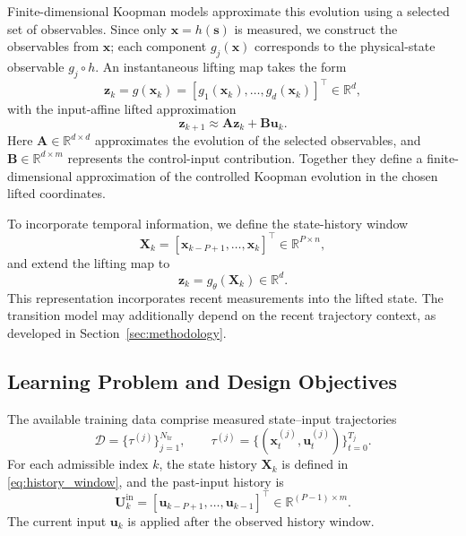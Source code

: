 \documentclass[journal]{IEEEtran}
\newcommand{\vx}{\mathbf{x}}
\newcommand{\vu}{\mathbf{u}}
\newcommand{\vz}{\mathbf{z}}
\newcommand{\vs}{\mathbf{s}}
\newcommand{\mA}{\mathbf{A}}
\newcommand{\mB}{\mathbf{B}}
\newcommand{\mX}{\mathbf{X}}
\newcommand{\mU}{\mathbf{U}}
\begin{document}
Finite-dimensional Koopman models approximate this evolution using a selected set of observables. Since only $\vx=h(\vs)$ is measured, we construct the observables from $\vx$; each component $g_j(\vx)$ corresponds to the physical-state observable $g_j\circ h$. An instantaneous lifting map takes the form
\begin{equation}
    \vz_k = g(\vx_k) = [g_1(\vx_k), \ldots, g_d(\vx_k)]^\top \in \mathbb{R}^d,
    \label{eq:instantaneous_lifting}
\end{equation}
with the input-affine lifted approximation
\begin{equation}
    \vz_{k+1} \approx \mA \vz_k + \mB \vu_k.
    \label{eq:linear_lifted}
\end{equation}
Here $\mA \in \mathbb{R}^{d\times d}$ approximates the evolution of the selected observables, and $\mB \in \mathbb{R}^{d\times m}$ represents the control-input contribution. Together they define a finite-dimensional approximation of the controlled Koopman evolution in the chosen lifted coordinates.

To incorporate temporal information, we define the state-history window
\begin{equation}
    \mX_k = [\vx_{k-P+1}, \ldots, \vx_k]^\top \in \mathbb{R}^{P\times n},
    \label{eq:history_window}
\end{equation}
and extend the lifting map to
\begin{equation}
    \vz_k = g_\theta(\mX_k) \in \mathbb{R}^d.
    \label{eq:temporal_lifting}
\end{equation}
This representation incorporates recent measurements into the lifted state. The transition model may additionally depend on the recent trajectory context, as developed in Section~\ref{sec:methodology}.

\subsection{Learning Problem and Design Objectives}
\label{sec:problem}

The available training data comprise measured state--input trajectories
\begin{equation}
    \mathcal{D} = \{\tau^{(j)}\}_{j=1}^{N_{\mathrm{tr}}}, \qquad
    \tau^{(j)} = \{(\vx_t^{(j)}, \vu_t^{(j)})\}_{t=0}^{T_j}.
    \label{eq:trajectory_dataset}
\end{equation}
For each admissible index $k$, the state history $\mX_k$ is defined in \eqref{eq:history_window}, and the past-input history is
\begin{equation}
    \mU_k^{\mathrm{in}} = [\vu_{k-P+1}, \ldots, \vu_{k-1}]^{\top}
    \in \mathbb{R}^{(P-1)\times m}.
    \label{eq:input_history_problem}
\end{equation}
The current input $\vu_k$ is applied after the observed history window.
\end{document}
